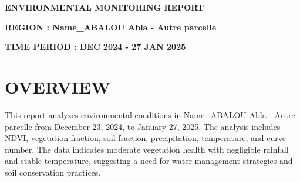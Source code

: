 \documentclass[12pt,a4paper]{article}
\begin{document}
\begin{titlepage}
    \textbf{\Huge \color{hydrosensblue}{RSS}}
    
    \vspace{0.5cm}
    
    \textbf{\huge \color{hydrosensblue}{HYDROSENS}}
    
    \vspace{0.5cm}
    
    \textbf{\Large{ENVIRONMENTAL MONITORING REPORT}}
    
    \vspace{1cm}
    
    \vspace{1cm}
    
    \textbf{\Large{REGION : \quad Name\_ABALOU Abla - Autre parcelle}}
    
    \vspace{0.5cm}
    
    \textbf{\Large{TIME PERIOD :  DEC 2024 - 27 JAN 2025}}
\end{titlepage}

\newpage

\section*{OVERVIEW}

\begin{minipage}{\textwidth}
This report analyzes environmental conditions in Name\_ABALOU Abla - Autre parcelle from December 23, 2024, to January 27, 2025. The analysis includes NDVI, vegetation fraction, soil fraction, precipitation, temperature, and curve number. The data indicates moderate vegetation health with negligible rainfall and stable temperature, suggesting a need for water management strategies and soil conservation practices.
\end{minipage}

\vspace{1cm}
\end{document}
